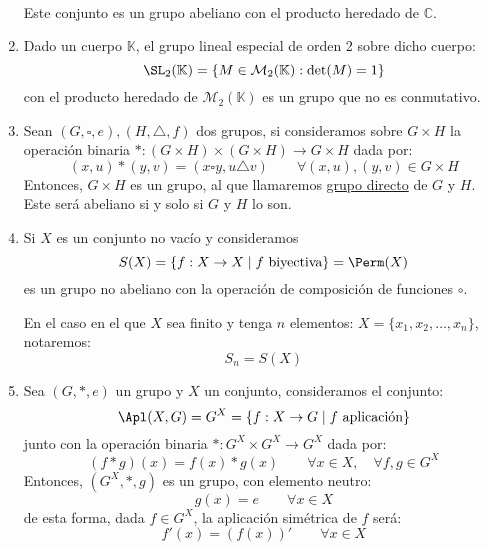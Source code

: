 \begin{ejemplo}
\begin{enumerate}
\begin{align*}
             \end{align*}
             Este conjunto es un grupo abeliano con el producto heredado de $\mathbb{C}$.
         \item Dado un cuerpo $\mathbb{K}$, el grupo lineal especial de orden 2 sobre dicho cuerpo:
             \begin{equation*}
                 \SL_2(\mathbb{K}) = \{M\in \mathcal{M}_2(\mathbb{K}) : \det(M) = 1\}
             \end{equation*}
             con el producto heredado de $\mathcal{M}_2(\mathbb{K})$ es un grupo que no es conmutativo.
         \item Sean $(G,\square,e),(H,\triangle,f)$ dos grupos, si consideramos sobre $G\times H$ la operación binaria $\ast:(G\times H)\times(G\times H)\rightarrow G\times H$  dada por:
             \begin{equation*}
                 (x,u) \ast (y,v) = (x\square y, u\triangle v) \qquad \forall (x,u),(y,v)\in G\times H
             \end{equation*}
             Entonces, $G\times H$ es un grupo, al que llamaremos \underline{grupo directo} de $G$ y $H$. Este será abeliano si y solo si $G$ y $H$ lo son.
         \item Si $X$ es un conjunto no vacío y consideramos
             \begin{equation*}
                 S(X) = \{f:X\rightarrow X \mid f \text{\ biyectiva}\} = \Perm(X)
             \end{equation*}
             es un grupo no abeliano con la operación de composición de funciones $\circ$.

             En el caso en el que $X$ sea finito y tenga $n$ elementos: $X = \{x_1, x_2, \ldots, x_n\}$, notaremos:
             \begin{equation*}
                 S_n = S(X)
             \end{equation*}
         \item Sea $(G,\ast,e)$ un grupo y $X$ un conjunto, consideramos el conjunto:
             \begin{equation*}
                 \Apl(X,G) = G^X = \{f:X\rightarrow G \mid f \text{\ aplicación}\}
             \end{equation*}
             junto con la operación binaria $\ast:G^X\times G^X \rightarrow G^X$ dada por:
             \begin{equation*}
                 (f\ast g)(x) = f(x)\ast g(x) \qquad \forall x\in X, \quad \forall f,g\in G^X
             \end{equation*}
             Entonces, $(G^X, \ast, g)$ es un grupo, con elemento neutro:
             \begin{equation*}
                 g(x) = e \qquad \forall x\in X
             \end{equation*}
             de esta forma, dada $f\in G^X$, la aplicación simétrica de $f$ será:
             \begin{equation*}
                 f'(x) = {(f(x))}' \qquad \forall x\in X
             \end{equation*}


\end{enumerate}
\end{ejemplo}
